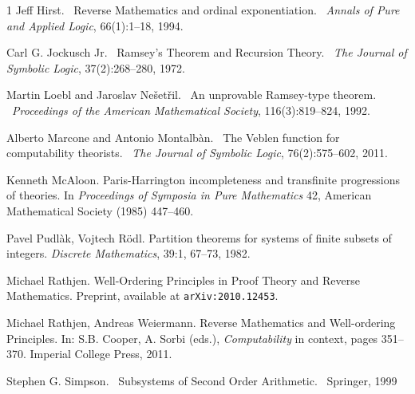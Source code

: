 \documentclass{amsart}
\begin{document}
\begin{thebibliography}{1}
 Jeff Hirst.
 \newblock\ Reverse Mathematics and ordinal exponentiation.
 \newblock\ {\em Annals of Pure and Applied Logic}, 66(1):1--18, 1994.

 Carl G. Jockusch Jr.
 \newblock\ Ramsey's Theorem and Recursion Theory.
 \newblock\ {\em The Journal of Symbolic Logic}, 37(2):268--280, 1972.
 
 Martin Loebl and Jaroslav Ne{\v{s}}et{\v{r}}il.
 \newblock\ An unprovable Ramsey-type theorem.
 \newblock\ {\em Proceedings of the American Mathematical Society}, 116(3):819--824, 1992.

 Alberto Marcone and Antonio Montalb\`an.
 \newblock\ The Veblen function for computability theorists.
 \newblock\ {\em The Journal of Symbolic Logic}, 76(2):575--602, 2011.

Kenneth McAloon.
Paris-Harrington incompleteness and transfinite progressions of theories.
In \textit{Proceedings of Symposia in Pure Mathematics} 42, American Mathematical Society 
(1985) 447--460.

Pavel Pudl\`ak, Vojtech R\"{o}dl. 
Partition theorems for systems of finite subsets of integers. 
\textit{Discrete Mathematics}, 39:1, 67--73, 1982.

Michael Rathjen. 
Well-Ordering Principles in Proof Theory and Reverse Mathematics.
Preprint, available at \texttt{arXiv:2010.12453}.

Michael Rathjen, Andreas Weiermann. 
Reverse Mathematics and Well-ordering Principles.
In: S.B. Cooper, A. Sorbi (eds.), {\it Computability} in context, pages 351--370. Imperial College Press, 2011.


 Stephen G. Simpson.
 \newblock\ Subsystems of Second Order Arithmetic.
 \newblock\ Springer, 1999

\end{thebibliography}
\end{document}

